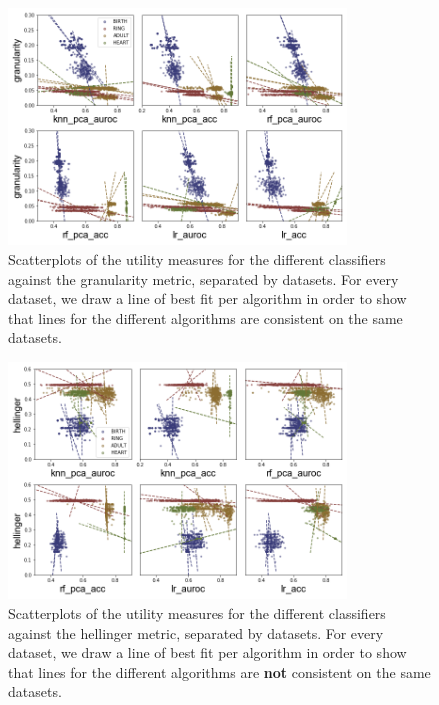 \begin{figure}
    \centering
    \includegraphics[width=0.8\textwidth]{project/fig/scatter_sep_trends/granularity_scatter.png}
    \caption{Scatterplots of the utility measures for the different classifiers against the granularity metric, separated by datasets. For every dataset, we draw a line of best fit per algorithm in order to show that lines for the different algorithms are consistent on the same datasets.}
    \label{fig:sep_trends_gran}
\end{figure}

\begin{figure}
    \centering
    \includegraphics[width=0.8\textwidth]{project/fig/scatter_sep_trends/hellinger_scatter.png}
    \caption{Scatterplots of the utility measures for the different classifiers against the hellinger metric, separated by datasets. For every dataset, we draw a line of best fit per algorithm in order to show that lines for the different algorithms are \textbf{not} consistent on the same datasets.}
    \label{fig:sep_trends_hell}
\end{figure}

